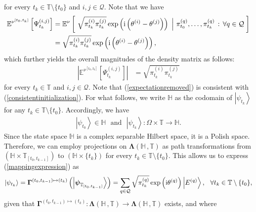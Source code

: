 \documentclass[12pt,a4paper]{article}
\def\T{\mathbb{T}}
\begin{document}
for every $t_k\in\T\setminus\{t_0\}$ and $i,j\in \mathcal{Q}$. Note that we have
\begin{align}
\mathbb{E}^{\nu^{[t_{0},t_{k}]}}\left[\Psi_{t_{k}}^{(i,j)}\right] &= \mathbb{E}^{\nu}\left[ \,\,  \sqrt{\pi_{t_{k}}^{(i)}\pi_{t_{k}}^{(j)}}\exp\left( \text{i}\left( \theta^{(i)} - \theta^{(j)} \right) \right) \,\, \left| \,\, \pi_{t_{0}}^{(q)}, \ldots, \pi_{t_{k}}^{(q)} \,: \, \forall q\in\mathcal{Q} \, \right.\right] \notag \\
&= \sqrt{\pi_{t_{k}}^{(i)}\pi_{t_{k}}^{(j)}}\exp\left( \text{i}\left( \theta^{(i)} - \theta^{(j)} \right) \right), 
\end{align}
which further yields the overall magnitudes of the density matrix as follows:
\begin{align}
\left|\mathbb{E}^{\nu^{[t_{0},t_{k}]}}\left[\Psi_{t_{k}}^{(i,j)}\right] \right| &= \sqrt{\pi_{t_{k}}^{(i)}\pi_{t_{k}}^{(j)}} \label{expectationremoved} 
\end{align}
for every $t_k\in\T$ and $i,j\in \mathcal{Q}$. Note that (\ref{expectationremoved}) is consistent with (\ref{consistentinitialization}). For what follows, we write $\mathbb{H}$ as the codomain of $\left|\psi_{t_{k}}\right\rangle$ for any $t_{k}\in\T\setminus\{t_0\}$. Accordingly, we have 
\begin{align}
\left|\psi_{t_{0}}\right\rangle \in \mathbb{H} \,\,\,\, \text{and} \,\,\,\, \left|\psi_{t_{k}}\right\rangle : \Omega \times \T \rightarrow \mathbb{H}.  
\end{align}
Since the state space $\mathbb{H}$ is a complex separable Hilbert space, it is a Polish space. Therefore, we can employ projections on $\boldsymbol{\Lambda}(\mathbb{H} \,, \T)$ as path transformations from $(\mathbb{H}\times\T_{[t_0,t_{k-1}]})$ to $(\mathbb{H}\times \{t_{k}\})$ for every $t_{k}\in\T\setminus\{t_0\}$. This allows us to express (\ref{mappingexpression}) as
\begin{align}
\left|\psi_{t_{k}}\right\rangle = \boldsymbol{\Gamma}^{(t_0,t_{k-1})\mapsto(t_k)}\left( \left|\boldsymbol{\psi}_{\T_{[t_0,t_{k-1}]}}\right\rangle \right)  = \sum_{q\in\mathcal{Q}} \sqrt{\pi_{t_{k}}^{(q)}} \exp\left( \text{i} \theta^{(q)} \right) \left|E^{(q)}\right\rangle, \hspace{0.1in} \text{$\forall t_{k}\in\T\setminus\{t_0\}$}, \label{rewritetransformation}
\end{align}
given that $\boldsymbol{\Gamma}^{(t_0,t_{k-1})\mapsto(t_k)}: \boldsymbol{\Lambda}(\mathbb{H} \,, \T) \rightarrow \boldsymbol{\Lambda}(\mathbb{H} \,, \T)$ exists, and where
\end{document}
